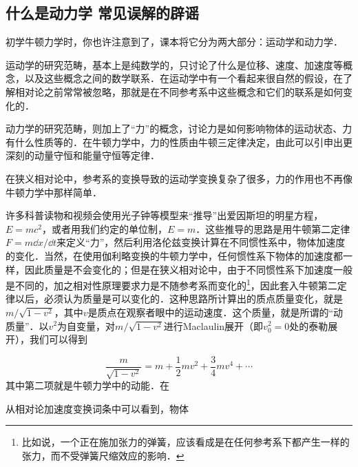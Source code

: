 

\subsection{什么是动力学 常见误解的辟谣}
初学牛顿力学时，你也许注意到了，课本将它分为两大部分：运动学和动力学．

运动学的研究范畴，基本上是纯数学的，只讨论了什么是位移、速度、加速度等概念，以及这些概念之间的数学联系．在运动学中有一个看起来很自然的假设，在了解相对论之前常常被忽略，那就是在不同参考系中这些概念和它们的联系是如何变化的．

动力学的研究范畴，则加上了“力”的概念，讨论力是如何影响物体的运动状态、力有什么性质等的．在牛顿力学中，力的性质由牛顿三定律决定，由此可以引申出更深刻的动量守恒和能量守恒等定律．

在狭义相对论中，参考系的变换导致的运动学变换复杂了很多，力的作用也不再像牛顿力学中那样简单．

许多科普读物和视频会使用光子钟等模型来“推导”出爱因斯坦的明星方程，$E=mc^2$，或者用我们约定的单位制，$E=m$．这些推导的思路是用牛顿第二定律$F=m\dd x/\dd t$来定义“力”，然后利用洛伦兹变换计算在不同惯性系中，物体加速度的变化．当然，在使用伽利略变换的牛顿力学中，任何惯性系下物体的加速度都一样，因此质量是不会变化的；但是在狭义相对论中，由于不同惯性系下加速度一般是不同的，加之相对性原理要求力是不随参考系而变化的\footnote{比如说，一个正在施加张力的弹簧，应该看成是在任何参考系下都产生一样的张力，而不受弹簧尺缩效应的影响．}，因此套入牛顿第二定律以后，必须认为质量是可以变化的．这种思路所计算出的质点质量变化，就是$m/\sqrt{1-v^2}$，其中$v$是质点在观察者眼中的运动速度．这个质量，就是所谓的“动质量”．以$v^2$为自变量，对$m/\sqrt{1-v^2}$进行Maclaulin展开（即$v_0^2=0$处的泰勒展开），我们可以得到

\begin{equation}
\frac{m}{\sqrt{1-v^2}}=m+\frac{1}{2}mv^2+\frac{3}{4}mv^4+\cdots
\end{equation}
其中第二项就是牛顿力学中的动能．在


从相对论加速度变换词条中可以看到，物体